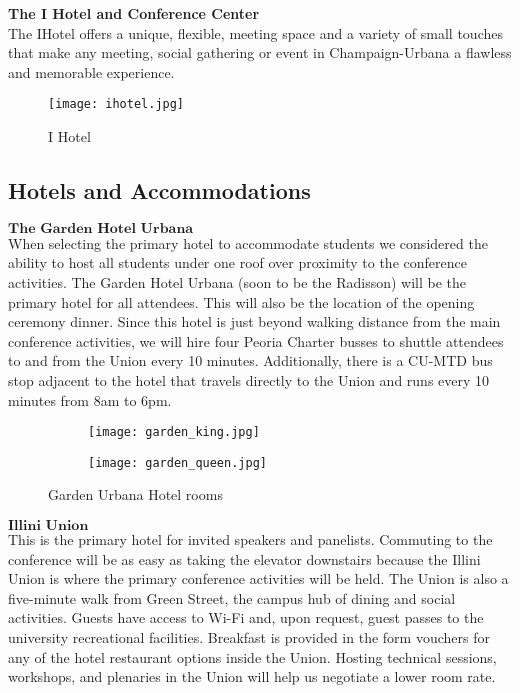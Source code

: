 \textbf{The I Hotel and Conference Center}\\
The IHotel offers a unique, flexible, meeting space and a variety of small touches that make any meeting, social gathering or event in Champaign-Urbana a flawless and memorable experience.\\

\begin{figure}[H]
    \centering
    \texttt{[image: ihotel.jpg]}
    \caption{I Hotel}
    \label{fig:beckman}
\end{figure}

\newpage
\subsection{Hotels and Accommodations}

$\textbf{The Garden Hotel Urbana}$\\
When selecting the primary hotel to accommodate students we considered the ability to host all students under one roof over proximity to the conference activities. The Garden Hotel Urbana (soon to be the Radisson) will be the primary hotel for all attendees. This will also be the location of the opening ceremony dinner. Since this hotel is just beyond walking distance from the main conference activities, we will hire four Peoria Charter busses to shuttle attendees to and from the Union every 10 minutes. Additionally, there is a CU-MTD bus stop adjacent to the hotel that travels directly to the Union and runs every 10 minutes from 8am to 6pm. \\ 
\begin{figure}[H]
	\centering
	\begin{subfigure}{0.5\textwidth}
		\centering
		\texttt{[image: garden\_king.jpg]}
	\end{subfigure}%
	\begin{subfigure}{0.5\textwidth}
		\centering
		\texttt{[image: garden\_queen.jpg]}
	\end{subfigure}
	\caption{Garden Urbana Hotel rooms}		
\end{figure} 

$\textbf{Illini Union}$\\
This is the primary hotel for invited speakers and panelists. Commuting to the conference will be as easy as taking the elevator downstairs because the Illini Union is where the primary conference activities will be held. The Union is also a five-minute walk from Green Street, the campus hub of dining and social activities. Guests have access to Wi-Fi and, upon request, guest passes to the university recreational facilities. Breakfast is provided in the form vouchers for any of the hotel restaurant options inside the Union. Hosting technical sessions, workshops, and plenaries in the Union will help us negotiate a lower room rate.\\

